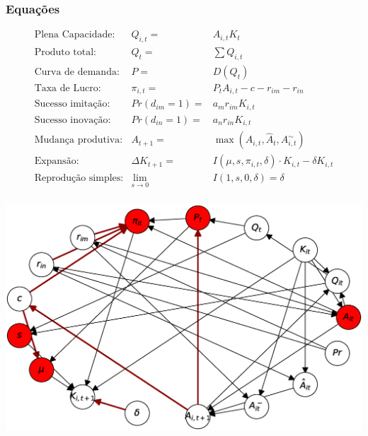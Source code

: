 \documentclass[12pt]{beamer}
\newlength\beamerleftmargin
\begin{document}
\begin{frame}
\frametitle{Equações}

\[ \begin{array}{lrl}
\mbox{Plena Capacidade:} & Q_{i,t} = &A_{i,t}K_t\\
\mbox{Produto total:} & Q_t=  &\sum{Q_{i,t}}\\
\mbox{Curva de demanda:} & P =  & D(Q_t) \\
\mbox{Taxa de Lucro:} & \pi_{i,t} =& P_tA_{i,t} -c -r_{im} - r_{in}\\
\mbox{Sucesso imitação:} & Pr(d_{im}=1) =& a_mr_{im}K_{i,t} \\
\mbox{Sucesso inovação:} & Pr(d_{in}=1) =& a_nr_{in}K_{i,t} \\
\mbox{Mudança produtiva:} & A_{t+1} =& \max(A_{i,t}, \hat{A}_{t}, A^{\sim}_{i,t}) \\
\mbox{Expansão:} & \Delta K_{t+1} =& I(\mu, s, \pi_{i,t}, \delta)\cdot K_{i,t} -\delta K_{i,t}\\
\mbox{Reprodução simples:} &\lim_{s\to0} & I(1,s,0,\delta)  = \delta \\
\end{array}\] 
\end{frame}

\begin{frame}[plain]
\hspace*{-\beamerleftmargin}%
\includegraphics[width=\paperwidth,width=\paperwidth]{modelo.eps}
\end{frame} 
\end{document}
